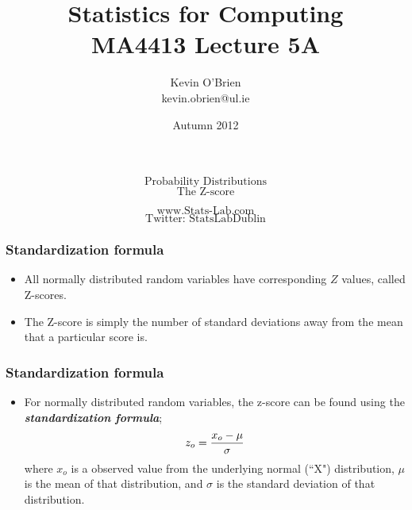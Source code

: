 \documentclass[a4]{beamer}
\title[MA4413]{Statistics for Computing \\ {\normalsize MA4413 Lecture 5A}}
\author[Kevin O'Brien]{Kevin O'Brien \\ {\scriptsize kevin.obrien@ul.ie}}
\date{Autumn 2012}
\institute[Maths \& Stats]{Dept. of Mathematics \& Statistics, \\ University \textit{of} Limerick}
\begin{document}
\begin{frame}
\huge{
\[\mbox{Probability Distributions}\]
\[\mbox{The Z-score}\]
}

\Large
\[\mbox{www.Stats-Lab.com}\]
\[\mbox{Twitter: StatsLabDublin}\]

\end{frame}

\begin{frame}
\frametitle{Standardization formula}
\Large
\vspace{-1cm}
\begin{itemize}
\item All normally distributed random variables have corresponding $Z$ values, called Z-scores.
\item The Z-score is simply the number of standard deviations away from the mean that a particular score is.

\end{itemize}
\end{frame}

\begin{frame}
\frametitle{Standardization formula}
\Large
\begin{itemize}
\item For normally distributed random variables, the z-score can be found using the \textbf{\emph{standardization formula}};
\[z_o = { x_o - \mu \over \sigma}\]
where $x_o$ is a observed value from the underlying normal (``X") distribution, $\mu$ is the mean of that distribution, and $\sigma$ is the standard deviation of that distribution.
\end{itemize}
\end{frame}
\end{document}
